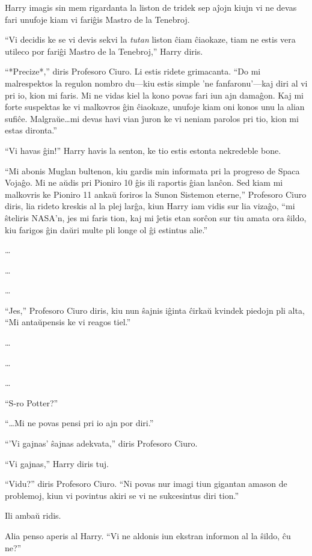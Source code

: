 Harry imagis sin mem rigardanta la liston de tridek sep aĵojn kiujn vi
ne devas fari unufoje kiam vi fariĝis Mastro de la Tenebroj.

``Vi decidis ke se vi devis sekvi la \emph{tutan} liston ĉiam
ĉiaokaze, tiam ne estis vera utileco por fariĝi Mastro de la
Tenebroj,'' Harry diris.


``*Precize*,'' diris Profesoro Ciuro. Li estis ridete grimacanta. ``Do
mi malrespektos la regulon nombro du—kiu estis simple 'ne
fanfaronu'—kaj diri al vi pri io, kion mi faris. Mi ne vidas kiel la
kono povas fari iun ajn damaĝon. Kaj mi forte suspektas ke vi
malkovros ĝin ĉiaokaze, unufoje kiam oni konos unu la alian
sufiĉe. Malgraŭe\ldots mi devas havi vian ĵuron ke vi neniam parolos
pri tio, kion mi estas dironta.''

``Vi havas ĝin!'' Harry havis la senton, ke tio estis estonta nekredeble bone.

``Mi abonis Muglan bultenon, kiu gardis min informata pri la progreso
de Spaca Vojaĝo. Mi ne aŭdis pri Pioniro 10 ĝis ili raportis ĝian
lanĉon. Sed kiam mi malkovris ke Pioniro 11 ankaŭ foriros la Sunon
Sistemon eterne,'' Profesoro Ciuro diris, lia rideto kreskis al la
plej larĝa, kiun Harry iam vidis sur lia vizaĝo, ``mi ŝteliris NASA'n,
jes mi faris tion, kaj mi ĵetis etan sorĉon sur tiu amata ora ŝildo, kiu
farigos ĝin daŭri multe pli longe ol ĝi estintus alie.''

\ldots

\ldots

\ldots

``Jes,'' Profesoro Ciuro diris, kiu nun ŝajnis iĝinta ĉirkaŭ kvindek
piedojn pli alta, ``Mi antaŭpensis ke vi reagos tiel.''

\ldots

\ldots

\ldots

``S-ro Potter?''

``\ldots Mi ne povas pensi pri io ajn por diri.''

``'Vi gajnas' ŝajnas adekvata,'' diris Profesoro Ciuro.

``Vi gajnas,'' Harry diris tuj.

``Vidu?'' diris Profesoro Ciuro. ``Ni povas nur imagi tiun gigantan
amason de problemoj, kiun vi povintus akiri se vi ne sukcesintus diri
tion.''

Ili ambaŭ ridis.

Alia penso aperis al Harry. ``Vi ne aldonis iun ekstran informon al la
ŝildo, ĉu ne?''

